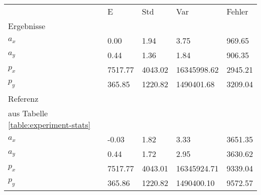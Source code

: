 \begin{tabular}{l|l|l|l|l}

     & E   & Std    & Var    & Fehler \\
\hhline{=|=|=|=|=}

Ergebnisse & & & & \\
$a_x$  &         0.00 &         1.94 &         3.75 &       969.65 \\
$a_y$  &         0.44 &         1.36 &         1.84 &       906.35 \\
$p_x$  &      7517.77 &      4043.02 &  16345998.62 &      2945.21 \\
$p_y$  &       365.85 &      1220.82 &   1490401.68 &      3209.04 \\

\hline
Referenz & & & & \\
aus Tabelle  \ref{table:experiment-stats} & & & & \\
$a_x$  &        -0.03 &         1.82 &         3.33 &      3651.35 \\
$a_y$  &         0.44 &         1.72 &         2.95 &      3630.62 \\
$p_x$  &      7517.77 &      4043.01 &  16345924.71 &      9339.04 \\
$p_y$  &       365.86 &      1220.82 &   1490400.10 &      9572.57 \\
\end{tabular}
